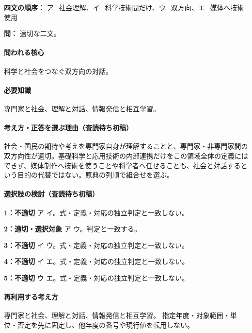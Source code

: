 \noindent\textbf{四文の順序：} ア=社会理解、イ=科学技術間だけ、ウ=双方向、エ=媒体へ技術使用\par

\noindent\textbf{問：} 適切な二文。\par

\paragraph{問われる核心} 科学と社会をつなぐ双方向の対話。

\paragraph{必要知識} 専門家と社会、理解と対話、情報発信と相互学習。

\paragraph{考え方・正答を選ぶ理由（査読待ち初稿）} 社会・国民の期待や考えを専門家自身が理解することと、専門家・非専門家間の双方向性が適切。基礎科学と応用技術の内部連携だけをこの領域全体の定義にはできず、媒体制作へ技術を使うことや科学者へ任せることも、社会と対話するという目的の代替ではない。原典の列順で組合せを選ぶ。

\paragraph{選択肢の検討（査読待ち初稿）}\mbox{}\par

\noindent\textbf{1：不適切} ア イ。式・定義・対応の独立判定と一致しない。\par

\noindent\textbf{2：適切・選択対象} ア ウ。判定と一致する。\par

\noindent\textbf{3：不適切} イ ウ。式・定義・対応の独立判定と一致しない。\par

\noindent\textbf{4：不適切} イ エ。式・定義・対応の独立判定と一致しない。\par

\noindent\textbf{5：不適切} ウ エ。式・定義・対応の独立判定と一致しない。\par

\paragraph{再利用する考え方} 専門家と社会、理解と対話、情報発信と相互学習。 指定年度・対象範囲・単位・否定を先に固定し、他年度の番号や現行値を転用しない。

